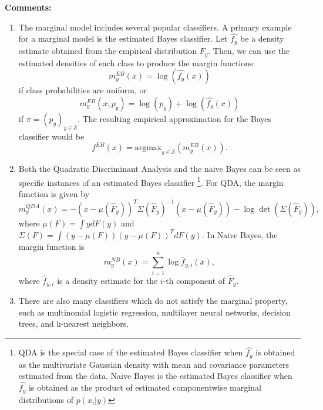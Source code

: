 \documentclass[12pt]{article}
\begin{document}
\textbf{Comments:}
\begin{enumerate}
\item The marginal model includes several popular classifiers.
A primary example for a marginal model is the estimated Bayes
classifier. Let $\hat{f_y}$ be a density estimate obtained from the
empirical distribution $\hat{F_y}$. Then, we can use the estimated
densities of each class to produce the margin functions:
\[ m^{EB}_y(x) = \log(\hat{f_{y}}(x))\]
if class probabilities are uniform, or 
\[m^{EB}_y(x,p_y) = \log(p_y) + \log(\hat{f_y}(x))\]
if $\pi = (p_y)_{y \in \mathcal{S}}$.
The resulting empirical approximation for the Bayes classifier
would be 
\[ f^{EB}(x) = \text{argmax}_{y \in \mathcal{S}}(m^{EB}_y(x)).\]
\item Both the Quadratic Discriminant Analysis and the naive Bayes can be seen as specific instances of an estimated Bayes classifier
\footnote{QDA is the special case of the estimated Bayes classifier when $\hat{f_y}$ is obtained as
the multivariate Gaussian density with mean and covariance parameters estimated from the data.
Naive Bayes is the estimated Bayes classifier when $\hat{f_y}$ is obtained as the product of estimated componentwise marginal distributions
of $p(x_i|y)$}. 
For QDA, the margin function is
given by
\[
m_y^{QDA}(x) = -(x - \mu(\hat{F}_y))^T \Sigma(\hat{F}_y)^{-1} (x-\mu(\hat{F}_y)) - \log\det(\Sigma(\hat{F}_y)),
\]
where $\mu(F) = \int y dF(y)$ and $\Sigma(F) = \int (y-\mu(F))(y-\mu(F))^T dF(y)$.
In Naive Bayes, the margin function is
\[
m^{NB}_y(x) = \sum_{i=1}^n \log \hat{f}_{y, i}(x),
\]
where $\hat{f}_{y, i}$ is a density estimate for the $i$-th component of
$\hat{F}_y$.
\item There are also many classifiers which do not satisfy the marginal property, such as multinomial logistic regression,
multilayer neural networks, decision trees, and k-nearest neighbors.
\end{enumerate}
\end{document}
